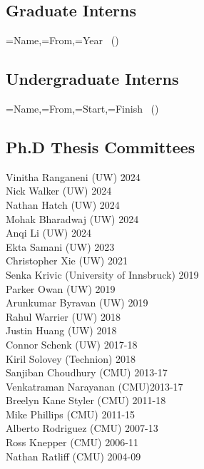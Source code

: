 \subsection{Graduate Interns}
\noindent
{}
{\name=Name,\from=From,\year=Year}
{\name~(\from) \hfill \year\\
}

\subsection{Undergraduate Interns}
\noindent
{}
{\name=Name,\from=From,\start=Start,\finish=Finish}
{\name~(\from) \hfill \DTLifnullorempty{\start}{}{\start-}\finish\\
}

\subsection{Ph.D Thesis Committees}
\noindent
Vinitha Ranganeni (UW) \hfill 2024\\
Nick Walker (UW) \hfill 2024\\
Nathan Hatch (UW) \hfill 2024\\
Mohak Bharadwaj (UW) \hfill 2024\\
Anqi Li (UW) \hfill 2024\\
Ekta Samani (UW) \hfill 2023\\
Christopher Xie (UW) \hfill 2021\\
Senka Krivic (University of Innsbruck) \hfill 2019\\
Parker Owan (UW) \hfill 2019\\
Arunkumar Byravan (UW) \hfill 2019\\
Rahul Warrier (UW) \hfill 2018\\
Justin Huang (UW) \hfill 2018\\
Connor Schenk (UW) \hfill 2017-18\\
Kiril Solovey (Technion) \hfill 2018\\
Sanjiban Choudhury (CMU) \hfill 2013-17\\
Venkatraman Narayanan (CMU)\hfill 2013-17\\
Breelyn Kane Styler (CMU) \hfill 2011-18\\ 
Mike Phillips (CMU) \hfill 2011-15\\
Alberto Rodriguez (CMU) \hfill 2007-13\\
Ross Knepper  (CMU) \hfill 2006-11\\
Nathan Ratliff (CMU) \hfill 2004-09\\
